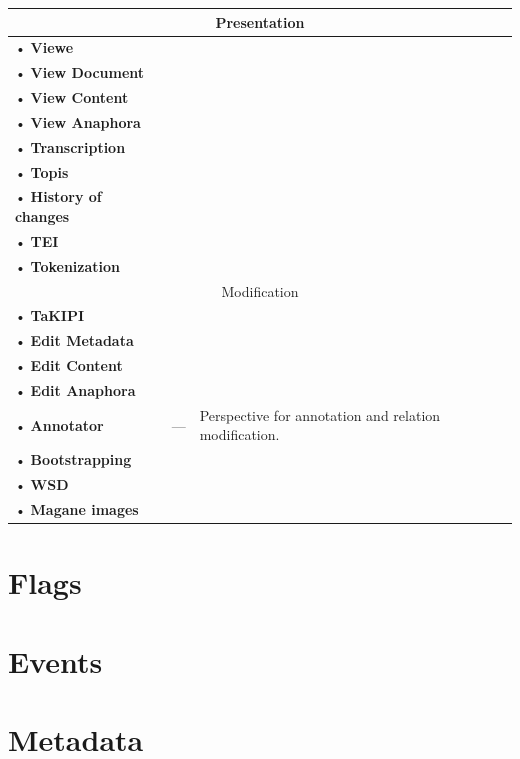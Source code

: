 \documentclass[a4paper,10pt,oneside]{scrbook}
\begin{document}
\begin{tabular}{lcp{8cm}}
  \hline
  \multicolumn{3}{c}{Presentation} \\
  \hline
  • \textbf{Viewe}\\
  • \textbf{View Document}\\
  • \textbf{View Content}\\
  • \textbf{View Anaphora}\\
  • \textbf{Transcription}\\
  • \textbf{Topis}\\
  • \textbf{History of changes}\\
  • \textbf{TEI}\\
  • \textbf{Tokenization} \\
  \hline
  \multicolumn{3}{c}{Modification}\\
  \hline
  • \textbf{TaKIPI}\\  
  • \textbf{Edit Metadata}\\
  • \textbf{Edit Content}\\
  • \textbf{Edit Anaphora}\\
  • \textbf{Annotator} & --- & Perspective for annotation and relation modification. \\
  • \textbf{Bootstrapping}\\
  • \textbf{WSD}\\
  • \textbf{Magane images}\\
  \hline
\end{tabular}


\section{Flags}

\section{Events}

\section{Metadata}
\end{document}
